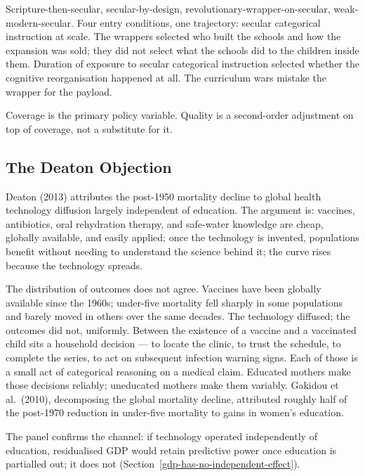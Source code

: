 \documentclass[12pt,letterpaper]{article}
\begin{document}
Scripture-then-secular, secular-by-design, revolutionary-wrapper-on-secular, weak-modern-secular. Four entry conditions, one trajectory: secular categorical instruction at scale. The wrappers selected who built the schools and how the expansion was sold; they did not select what the schools did to the children inside them. Duration of exposure to secular categorical instruction selected whether the cognitive reorganisation happened at all. The curriculum wars mistake the wrapper for the payload.

Coverage is the primary policy variable. Quality is a second-order adjustment on top of coverage, not a substitute for it.

\subsection{The Deaton Objection}\label{the-deaton-objection}

Deaton (2013) attributes the post-1950 mortality decline to global health technology diffusion largely independent of education. The argument is: vaccines, antibiotics, oral rehydration therapy, and safe-water knowledge are cheap, globally available, and easily applied; once the technology is invented, populations benefit without needing to understand the science behind it; the curve rises because the technology spreads.

The distribution of outcomes does not agree. Vaccines have been globally available since the 1960s; under-five mortality fell sharply in some populations and barely moved in others over the same decades. The technology diffused; the outcomes did not, uniformly. Between the existence of a vaccine and a vaccinated child sits a household decision --- to locate the clinic, to trust the schedule, to complete the series, to act on subsequent infection warning signs. Each of those is a small act of categorical reasoning on a medical claim. Educated mothers make those decisions reliably; uneducated mothers make them variably. Gakidou et al.\ (2010), decomposing the global mortality decline, attributed roughly half of the post-1970 reduction in under-five mortality to gains in women's education.

The panel confirms the channel: if technology operated independently of education, residualised GDP would retain predictive power once education is partialled out; it does not (Section~\ref{gdp-has-no-independent-effect}).
\end{document}
